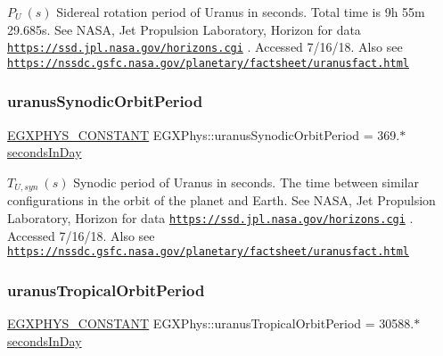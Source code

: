 $ P_{U} \ (s)$ Sidereal rotation period of Uranus in seconds. Total time is 9h 55m 29.\+685s. See N\+A\+SA, Jet Propulsion Laboratory, Horizon for data \href{https://ssd.jpl.nasa.gov/horizons.cgi}{\tt https\+://ssd.\+jpl.\+nasa.\+gov/horizons.\+cgi} . Accessed 7/16/18. Also see \href{https://nssdc.gsfc.nasa.gov/planetary/factsheet/uranusfact.html}{\tt https\+://nssdc.\+gsfc.\+nasa.\+gov/planetary/factsheet/uranusfact.\+html} \mbox{\label{group___e_g_x_phys-_constants-_astrophysics-_solar_system-_uranus-_orbit_gaddf14c8c085286e28628dbdd11378081}} 
\subsubsection{\texorpdfstring{uranus\+Synodic\+Orbit\+Period}{uranusSynodicOrbitPeriod}}
{\footnotesize\ttfamily \mbox{\hyperlink{group___e_g_x_phys-_constants-_macros_ga76980d288494ce1714c9ac68a95ba702}{E\+G\+X\+P\+H\+Y\+S\+\_\+\+C\+O\+N\+S\+T\+A\+NT}} E\+G\+X\+Phys\+::uranus\+Synodic\+Orbit\+Period = 369.$\ast$\mbox{\hyperlink{namespace_e_g_x_phys_a93d2a00d75411b58cbf63ab3fd1f8bc2}{seconds\+In\+Day}}}

$ T_{U,syn} \ (s)$ Synodic period of Uranus in seconds. The time between similar configurations in the orbit of the planet and Earth. See N\+A\+SA, Jet Propulsion Laboratory, Horizon for data \href{https://ssd.jpl.nasa.gov/horizons.cgi}{\tt https\+://ssd.\+jpl.\+nasa.\+gov/horizons.\+cgi} . Accessed 7/16/18. Also see \href{https://nssdc.gsfc.nasa.gov/planetary/factsheet/uranusfact.html}{\tt https\+://nssdc.\+gsfc.\+nasa.\+gov/planetary/factsheet/uranusfact.\+html} \mbox{\label{group___e_g_x_phys-_constants-_astrophysics-_solar_system-_uranus-_orbit_gaafe74005ae724e813166abbefc7a4458}} 
\subsubsection{\texorpdfstring{uranus\+Tropical\+Orbit\+Period}{uranusTropicalOrbitPeriod}}
{\footnotesize\ttfamily \mbox{\hyperlink{group___e_g_x_phys-_constants-_macros_ga76980d288494ce1714c9ac68a95ba702}{E\+G\+X\+P\+H\+Y\+S\+\_\+\+C\+O\+N\+S\+T\+A\+NT}} E\+G\+X\+Phys\+::uranus\+Tropical\+Orbit\+Period = 30588.$\ast$\mbox{\hyperlink{namespace_e_g_x_phys_a93d2a00d75411b58cbf63ab3fd1f8bc2}{seconds\+In\+Day}}}

